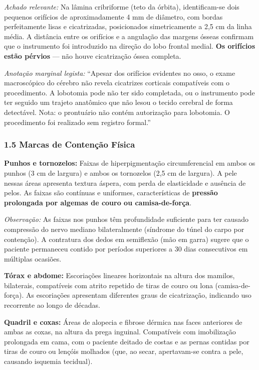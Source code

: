 \noindent \textit{Achado relevante:} Na lâmina cribriforme (teto da órbita), identificam-se dois pequenos orifícios de aproximadamente 4 mm de diâmetro, com bordas perfeitamente lisas e cicatrizadas, posicionados simetricamente a 2,5 cm da linha média. A distância entre os orifícios e a angulação das margens ósseas confirmam que o instrumento foi introduzido na direção do lobo frontal medial. \textbf{Os orifícios estão pérvios} --- não houve cicatrização óssea completa.

\noindent \textit{Anotação marginal legista:} ``Apesar dos orifícios evidentes no osso, o exame macroscópico do cérebro não revela cicatrizes corticais compatíveis com o procedimento. A lobotomia pode não ter sido completada, ou o instrumento pode ter seguido um trajeto anatômico que não lesou o tecido cerebral de forma detectável. Nota: o prontuário não contém autorização para lobotomia. O procedimento foi realizado sem registro formal.''

\subsubsection*{1.5 Marcas de Contenção Física}

\noindent \textbf{Punhos e tornozelos:} Faixas de hiperpigmentação circumferencial em ambos os punhos (3 cm de largura) e ambos os tornozelos (2,5 cm de largura). A pele nessas áreas apresenta textura áspera, com perda de elasticidade e ausência de pelos. As faixas são contínuas e uniformes, características de \textbf{pressão prolongada por algemas de couro ou camisa-de-força}.

\noindent \textit{Observação:} As faixas nos punhos têm profundidade suficiente para ter causado compressão do nervo mediano bilateralmente (síndrome do túnel do carpo por contenção). A contratura dos dedos em semiflexão (mão em garra) sugere que o paciente permaneceu contido por períodos superiores a 30 dias consecutivos em múltiplas ocasiões.

\noindent \textbf{Tórax e abdome:} Escoriações lineares horizontais na altura dos mamilos, bilaterais, compatíveis com atrito repetido de tiras de couro ou lona (camisa-de-força). As escoriações apresentam diferentes graus de cicatrização, indicando uso recorrente ao longo de décadas.

\noindent \textbf{Quadril e coxas:} Áreas de alopecia e fibrose dérmica nas faces anteriores de ambas as coxas, na altura da prega inguinal. Compatíveis com imobilização prolongada em cama, com o paciente deitado de costas e as pernas contidas por tiras de couro ou lençóis molhados (que, ao secar, apertavam-se contra a pele, causando isquemia tecidual).

